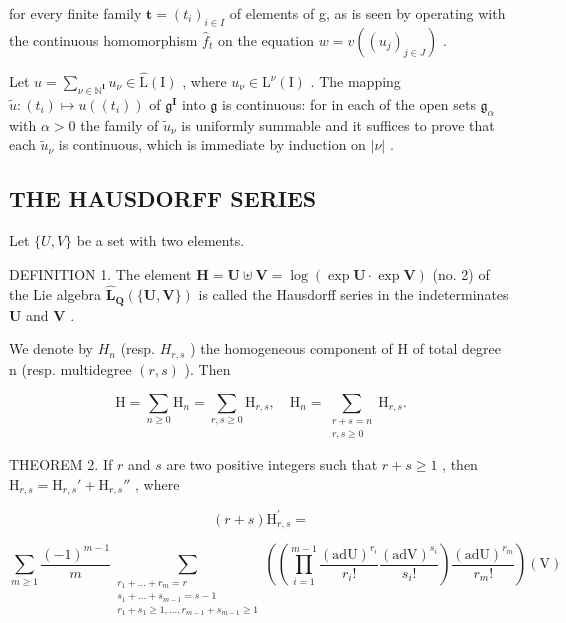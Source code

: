 for every finite family \(\boldsymbol{t} = (t_{i})_{i \in I}\) of elements of g, as is seen by operating with the continuous homomorphism \(\hat{f}_{t}\) on the equation \(w = v((u_{j})_{j \in J})\) .

Let \(u = \sum_{\nu \in \mathbb{N}^{\mathbf{I}}} u_{\nu} \in \hat{\mathrm{L}}(\mathrm{I})\) , where \(u_{\nu} \in \mathrm{L}^{\nu}(\mathrm{I})\) . The mapping \(\tilde{u}\colon (t_i)\mapsto u((t_i))\) of \(\mathfrak{g}^{\mathbf{I}}\) into \(\mathfrak{g}\) is continuous: for in each of the open sets \(\mathfrak{g}_{\alpha}\) with \(\alpha > 0\) the family of \(\tilde{u}_{\nu}\) is uniformly summable and it suffices to prove that each \(\tilde{u}_{\nu}\) is continuous, which is immediate by induction on \(|\nu|\) .

\subsection{THE HAUSDORFF SERIES}

Let \(\{U, V\}\) be a set with two elements.

DEFINITION 1. The element \(\mathbf{H} = \mathbf{U} \uplus \mathbf{V} = \log (\exp \mathbf{U} \cdot \exp \mathbf{V})\) (no. 2) of the Lie algebra \(\hat{\mathbf{L}}_{\mathbf{Q}}(\{\mathbf{U}, \mathbf{V}\})\) is called the Hausdorff series in the indeterminates \(\mathbf{U}\) and \(\mathbf{V}\) .

We denote by \(H_{n}\) (resp. \(H_{r,s}\) ) the homogeneous component of H of total degree n (resp. multidegree \((r, s)\) ). Then

\[
\mathrm{H} = \sum_ {n \geqslant 0} \mathrm{H} _ {n} = \sum_ {r, s \geqslant 0} \mathrm{H} _ {r, s}, \quad \mathrm{H} _ {n} = \sum_ {\substack {r + s = n \\ r, s \geqslant 0}} \mathrm{H} _ {r, s}.\tag{8}
\]

THEOREM 2. If \(r\) and \(s\) are two positive integers such that \(r + s \geqslant 1\) , then \(\mathrm{H}_{r,s} = \mathrm{H}_{r,s}' + \mathrm{H}_{r,s}''\) , where

\[
(r + s) \mathrm{H} _ {r, s} ^ {\prime} = \tag {9}
\]

\[
\sum_{m\geqslant 1}\frac{(-1)^{m - 1}}{m}\sum_{\substack{r_{1} + \dots +r_{m} = r\\ s_{1} + \dots +s_{m - 1} = s - 1\\ r_{1} + s_{1}\geqslant 1,\ldots ,r_{m - 1} + s_{m - 1}\geqslant 1}}\left(\left(\prod_{i = 1}^{m - 1}\frac{(\mathrm{adU})^{r_{i}}}{r_{i}!}\frac{(\mathrm{adV})^{s_{i}}}{s_{i}!}\right)\frac{(\mathrm{adU})^{r_{m}}}{r_{m}!}\right)(\mathrm{V})
\]

